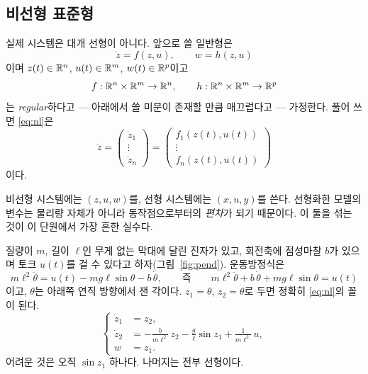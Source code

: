 \documentclass[11pt]{article}
\begin{document}
\subsection{비선형 표준형}
실제 시스템은 대개 선형이 아니다. 앞으로 쓸 일반형은
\begin{equation}\label{eq:nl}
   \dot z = f(z,u),\qquad w = h(z,u)
\end{equation}
이며 $z(t)\in\mathbb{R}^{n}$, $u(t)\in\mathbb{R}^{m}$, $w(t)\in\mathbb{R}^{p}$이고
\[
   f:\mathbb{R}^{n}\times\mathbb{R}^{m}\to\mathbb{R}^{n},\qquad h:\mathbb{R}^{n}\times\mathbb{R}^{m}\to\mathbb{R}^{p}
\]
는 \emph{regular}하다고 --- 아래에서 쓸 미분이 존재할 만큼 매끄럽다고 --- 가정한다.
풀어 쓰면 \eqref{eq:nl}은
\[
   \dot z=\begin{pmatrix}\dot z_1\\ \vdots\\ \dot z_n\end{pmatrix}
        =\begin{pmatrix}f_1(z(t),u(t))\\ \vdots\\ f_n(z(t),u(t))\end{pmatrix}
\]
이다.

\begin{note}[이 절의 기호]
비선형 시스템에는 $(z,u,w)$를, 선형 시스템에는 $(x,u,y)$를 쓴다. 선형화한
모델의 변수는 물리량 자체가 아니라 동작점으로부터의 \emph{편차}가 되기 때문이다.
이 둘을 섞는 것이 이 단원에서 가장 흔한 실수다.
\end{note}

\begin{example}[진자]\label{ex:pend}
질량이 $m$, 길이 $\ell$인 무게 없는 막대에 달린 진자가 있고, 회전축에 점성마찰
$b$가 있으며 토크 $u(t)$를 걸 수 있다고 하자(그림~\ref{fig:pend}). 운동방정식은
\[
   m\ell^{2}\ddot\theta = u(t) - mg\ell\sin\theta - b\,\dot\theta,
   \qquad\text{즉}\qquad
   m\ell^{2}\ddot\theta + b\,\dot\theta + mg\ell\sin\theta = u(t)
\]
이고, $\theta$는 아래쪽 연직 방향에서 잰 각이다. $z_1=\theta$, $z_2=\dot\theta$로
두면 정확히 \eqref{eq:nl}의 꼴이 된다.
\begin{equation}\label{eq:pendstate}
\left\{
\begin{aligned}
   \dot z_1 &= z_2,\\
   \dot z_2 &= -\frac{b}{m\ell^{2}}\,z_2 - \frac{g}{\ell}\sin z_1
               + \frac{1}{m\ell^{2}}\,u,\\
   w &= z_1 .
\end{aligned}\right.
\end{equation}
어려운 것은 오직 $\sin z_1$ 하나다. 나머지는 전부 선형이다.
\end{example}
\end{document}
